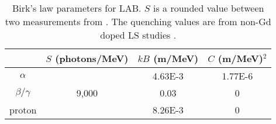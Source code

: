 \begin{table}[]
    \centering
    \begin{tabular}{c | c | c | c }
                   & $S$ (photons/MeV) & $kB$ (m/MeV) & $C$ (m/MeV)$^{2}$ \\ \hline
    $\alpha$       &                   & 4.63E-3 & 1.77E-6 \\
    $\beta/\gamma$ & 9,000             & 0.03    & 0 \\ 
    proton         &                   & 8.26E-3 & 0
    \end{tabular}
    \caption{Birk's law parameters for LAB. $S$ is a rounded value between two measurements from \cite{scotthaselschwardt_thesis_ref}. The quenching values are from non-Gd doped LS studies \cite{ls_alpha_quenching_ref,ls_proton_quenching_ref}.}
    \label{tab:Birks_law_parameters}
\end{table} 



